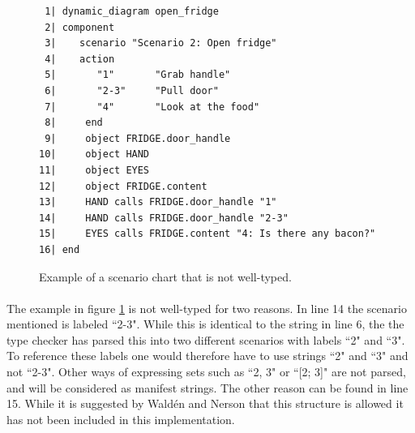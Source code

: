 \begin{figure}[H]
{\footnotesize
\begin{verbatim}
 1| dynamic_diagram open_fridge
 2| component
 3|    scenario "Scenario 2: Open fridge"
 4|    action
 5|       "1"       "Grab handle"
 6|       "2-3"     "Pull door"
 7|       "4"       "Look at the food"
 8|     end
 9|     object FRIDGE.door_handle 
10|     object HAND
11|     object EYES
12|     object FRIDGE.content
13|     HAND calls FRIDGE.door_handle "1"
14|     HAND calls FRIDGE.door_handle "2-3"
15|     EYES calls FRIDGE.content "4: Is there any bacon?"
16| end
\end{verbatim}
}
\caption{Example of a scenario chart that is not well-typed.}
\label{fig:not_well_typed}
\end{figure}

\paragraph{}
The example in figure \ref{fig:not_well_typed} is not well-typed for two reasons. In line 14 the scenario mentioned is labeled ``2-3". While this is identical to the string in line 6, the the type checker has parsed this into two different scenarios with labels ``2" and ``3". To reference these labels one would therefore have to use strings ``2" and ``3" and not ``2-3". Other ways of expressing sets such as ``2, 3" or ``[2; 3]" are not parsed, and will be considered as manifest strings. The other reason can be found in line 15. While it is suggested by Wald\'{e}n and Nerson that this structure is allowed it has not been included in this implementation.
